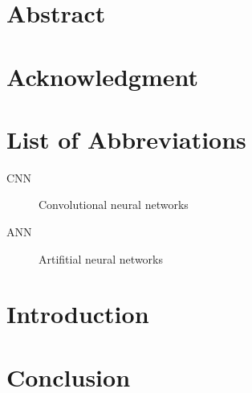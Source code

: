 \documentclass[a4paper, 12pt, oneside]{book}
\begin{document}
\frontmatter
\chapter*{Abstract}
\blindtext
{}
\nopagebreak

\chapter*{Acknowledgment}
\blindtext
{}

\tableofcontents
{}
\listoftables
{}
\listoffigures
{}

\chapter{List of Abbreviations}

\begin{description}

  \item[CNN] Convolutional neural networks
  \item[ANN] Artifitial neural networks

\end{description}

\mainmatter

\chapter*{Introduction}
\blindtext[5]





\chapter*{Conclusion}
\blindtext[5]


\appendix
\clearpage
{}
\addappheadtotoc


\backmatter

\nocite{*}


\end{document}

